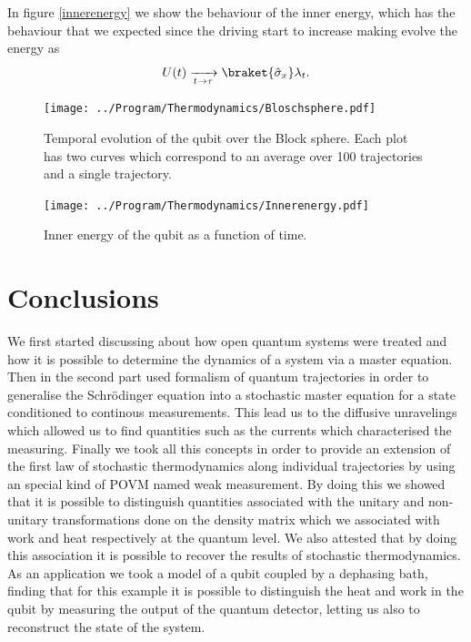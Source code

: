 In figure \ref{innerenergy} we show the behaviour of the inner energy, which has the behaviour that we expected since the driving start to increase making evolve the energy as
\[U(t)\xrightarrow[t\rightarrow \tau]{}\braket{\hat{\sigma}_x}\lambda_t.\]
\begin{figure}[h!]
\centering
\texttt{[image: ../Program/Thermodynamics/Bloschsphere.pdf]}
\caption{Temporal evolution of the qubit over the Block sphere. Each plot has two curves which correspond to an average over 100 trajectories and a single trajectory.}
\label{Blocksphere}
\end{figure}
\begin{figure}[h!]
\centering
\texttt{[image: ../Program/Thermodynamics/Innerenergy.pdf]}
\caption{Inner energy of the qubit as a function of time.}
\label{qbitinnerenergy}
\end{figure}
\chapter*{Conclusions}
We first started discussing about how open quantum systems were treated and how it is possible to determine the dynamics of a system via a master equation.\\
Then in the second part used formalism of quantum trajectories in order to generalise the Schr\"odinger equation into a stochastic master equation for a state conditioned to continous measurements. This lead us to the diffusive unravelings which allowed us to find quantities such as the currents which characterised the measuring.
Finally we took all this concepts in order to provide an extension of the first law of stochastic thermodynamics along individual trajectories by using an special kind of POVM named weak measurement. By doing this we showed that it is possible to distinguish quantities associated with the unitary and non-unitary transformations done on the density matrix which we associated with work and heat respectively at the quantum level.
We also attested that by doing this association it is possible to recover the results of stochastic thermodynamics.\\
As an application we took a model of a qubit coupled by a dephasing bath, finding that for this example it is possible to distinguish the heat and work in the qubit by measuring the output of the quantum detector, letting us also to reconstruct the state of the system.
